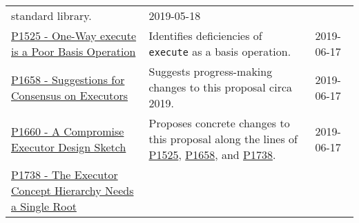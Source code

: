 \documentclass[a4paper,12pt,notitlepage,twoside,openright]{article}
\begin{document}
\begin{longtable}[]{@{}lll@{}}
\begin{minipage}[t]{0.54\columnwidth}
standard library.\strut
\end{minipage} & \begin{minipage}[t]{0.05\columnwidth}\raggedright
2019-05-18\strut
\end{minipage}\tabularnewline
\begin{minipage}[t]{0.32\columnwidth}\raggedright
\href{https://wg21.link/P1525}{P1525 - One-Way execute is a Poor Basis
Operation}\strut
\end{minipage} & \begin{minipage}[t]{0.54\columnwidth}\raggedright
Identifies deficiencies of \texttt{execute} as a basis
operation.\strut
\end{minipage} & \begin{minipage}[t]{0.05\columnwidth}\raggedright
2019-06-17\strut
\end{minipage}\tabularnewline
\begin{minipage}[t]{0.32\columnwidth}\raggedright
\href{https://wg21.link/P1658}{P1658 - Suggestions for Consensus on
Executors}\strut
\end{minipage} & \begin{minipage}[t]{0.54\columnwidth}\raggedright
Suggests progress-making changes to this proposal circa 2019.\strut
\end{minipage} & \begin{minipage}[t]{0.05\columnwidth}\raggedright
2019-06-17\strut
\end{minipage}\tabularnewline
\begin{minipage}[t]{0.32\columnwidth}\raggedright
\href{https://wg21.link/P1660}{P1660 - A Compromise Executor Design
Sketch}\strut
\end{minipage} & \begin{minipage}[t]{0.54\columnwidth}\raggedright
Proposes concrete changes to this proposal along the lines of
\href{https://wg21.link/P1525}{P1525},
\href{https://wg21.link/P1658}{P1658}, and
\href{https://wg21.link/P1738}{P1738}.\strut
\end{minipage} & \begin{minipage}[t]{0.05\columnwidth}\raggedright
2019-06-17\strut
\end{minipage}\tabularnewline
\begin{minipage}[t]{0.32\columnwidth}\raggedright
\href{https://wg21.link/P1738}{P1738 - The Executor Concept Hierarchy
Needs a Single Root}\strut
\end{minipage} & \begin{minipage}[t]{0.54\columnwidth}\raggedright

\end{minipage}
\end{longtable}
\end{document}

